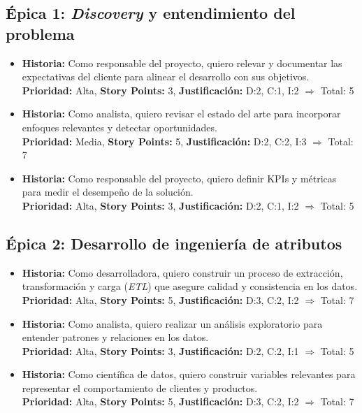 \documentclass[
11pt, %
]{charter}
\begin{document}
\subsection*{\'Epica 1: \textit{Discovery} y entendimiento del problema}
\begin{itemize}
  \item \textbf{Historia:} Como responsable del proyecto, quiero relevar y documentar las expectativas del cliente para alinear el desarrollo con sus objetivos.\\
  \textbf{Prioridad:} Alta, \textbf{Story Points:} 3, \textbf{Justificación:} D:2, C:1, I:2 $\Rightarrow$ Total: 5

  \item \textbf{Historia:} Como analista, quiero revisar el estado del arte para incorporar enfoques relevantes y detectar oportunidades.\\
  \textbf{Prioridad:} Media, \textbf{Story Points:} 5, \textbf{Justificación:} D:2, C:2, I:3 $\Rightarrow$ Total: 7

  \item \textbf{Historia:} Como responsable del proyecto, quiero definir KPIs y métricas para medir el desempeño de la solución.\\
  \textbf{Prioridad:} Alta, \textbf{Story Points:} 3, \textbf{Justificación:} D:2, C:1, I:2 $\Rightarrow$ Total: 5
\end{itemize}

\subsection*{\'Epica 2: Desarrollo de ingeniería de atributos}
\begin{itemize}
  \item \textbf{Historia:} Como desarrolladora, quiero construir un proceso de extracción, transformación y carga (\textit{ETL}) que asegure calidad y consistencia en los datos.\\
  \textbf{Prioridad:} Alta, \textbf{Story Points:} 5, \textbf{Justificación:} D:3, C:2, I:2 $\Rightarrow$ Total: 7

  \item \textbf{Historia:} Como analista, quiero realizar un análisis exploratorio para entender patrones y relaciones en los datos.\\
  \textbf{Prioridad:} Alta, \textbf{Story Points:} 3, \textbf{Justificación:} D:2, C:2, I:1 $\Rightarrow$ Total: 5

  \item \textbf{Historia:} Como científica de datos, quiero construir variables relevantes para representar el comportamiento de clientes y productos.\\
  \textbf{Prioridad:} Alta, \textbf{Story Points:} 5, \textbf{Justificación:} D:3, C:2, I:2 $\Rightarrow$ Total: 7
\end{itemize}
\end{document}
